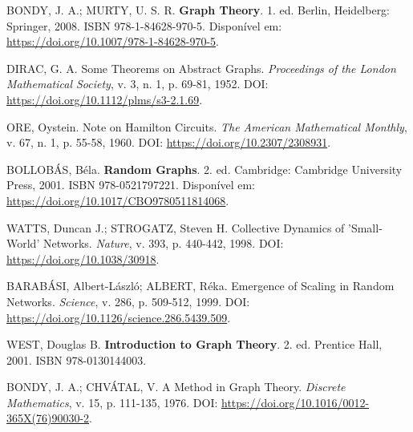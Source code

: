 \documentclass[12pt, openright, oneside, a4paper, chapter=TITLE, section=TITLE, subsection=TITLE, subsubsection=TITLE, brazil]{abntex2}
\begin{document}
\noindent
BONDY, J. A.; MURTY, U. S. R. \textbf{Graph Theory}. 1. ed. Berlin, Heidelberg: Springer, 2008. ISBN 978-1-84628-970-5. Disponível em: \url{https://doi.org/10.1007/978-1-84628-970-5}.

\noindent
DIRAC, G. A. Some Theorems on Abstract Graphs. \textit{Proceedings of the London Mathematical Society}, v. 3, n. 1, p. 69-81, 1952. DOI: \url{https://doi.org/10.1112/plms/s3-2.1.69}.

\noindent
ORE, Oystein. Note on Hamilton Circuits. \textit{The American Mathematical Monthly}, v. 67, n. 1, p. 55-58, 1960. DOI: \url{https://doi.org/10.2307/2308931}.

\noindent
BOLLOBÁS, Béla. \textbf{Random Graphs}. 2. ed. Cambridge: Cambridge University Press, 2001. ISBN 978-0521797221. Disponível em: \url{https://doi.org/10.1017/CBO9780511814068}.

\noindent
WATTS, Duncan J.; STROGATZ, Steven H. Collective Dynamics of 'Small-World' Networks. \textit{Nature}, v. 393, p. 440-442, 1998. DOI: \url{https://doi.org/10.1038/30918}.

\noindent
BARABÁSI, Albert-László; ALBERT, Réka. Emergence of Scaling in Random Networks. \textit{Science}, v. 286, p. 509-512, 1999. DOI: \url{https://doi.org/10.1126/science.286.5439.509}.

\noindent
WEST, Douglas B. \textbf{Introduction to Graph Theory}. 2. ed. Prentice Hall, 2001. ISBN 978-0130144003.

\noindent
BONDY, J. A.; CHVÁTAL, V. A Method in Graph Theory. \textit{Discrete Mathematics}, v. 15, p. 111-135, 1976. DOI: \url{https://doi.org/10.1016/0012-365X(76)90030-2}.


\end{document}
